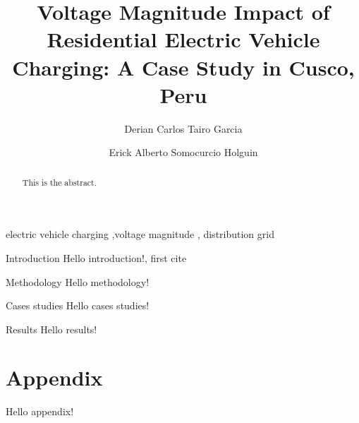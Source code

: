 \documentclass[12pt, 3p]{elsarticle}
\begin{document}
\title{Voltage Magnitude Impact of Residential Electric Vehicle Charging: 
A Case Study in Cusco, Peru}

\author[1]{Derian Carlos Tairo Garcia}
\author[1]{Erick Alberto Somocurcio Holguin} 

\begin{abstract}
    This is the abstract.
\end{abstract}

\begin{keyword}
    electric vehicle charging \sep voltage magnitude \sep 
    distribution grid 
\end{keyword}

\begin{frontmatter}
    
\end{frontmatter}

\begin{section}{Introduction}\label{sec:introduction}
    Hello introduction!, first cite \cite{Richardson2013}
\end{section}

\begin{section}{Methodology}\label{sec:methodology}
    Hello methodology!
\end{section}

\begin{section}{Cases studies}\label{sec:cases}
    Hello cases studies!
\end{section}

\begin{section}{Results}\label{sec:results}
    Hello results!
\end{section}

\appendix
\section{Appendix}
    Hello appendix!




\end{document}
